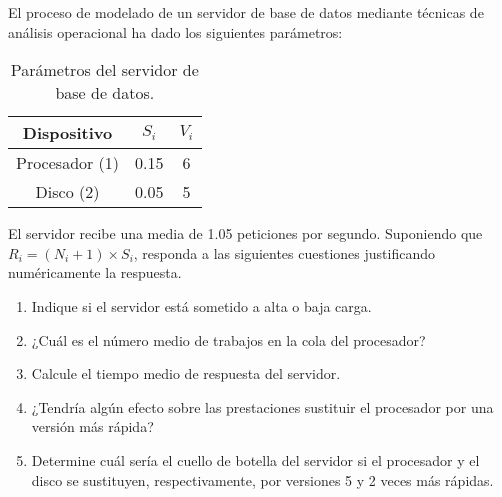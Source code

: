 \begin{ejercicio}\label{ej:5.24}
    El proceso de modelado de un servidor de base de datos mediante técnicas de análisis operacional ha dado los siguientes parámetros:
    \begin{table}[h]
        \centering
        \begin{tabular}{|c|c|c|}
            \hline
            Dispositivo & $S_i$ & $V_i$ \\
            \hline
            Procesador (1) & 0.15 & 6 \\
            Disco (2) & 0.05 & 5 \\
            \hline
        \end{tabular}
        \caption{Parámetros del servidor de base de datos.}
        \label{tab:5.24}
    \end{table}
    El servidor recibe una media de 1.05 peticiones por segundo. Suponiendo que $R_i = (N_i + 1) \times S_i$, responda a las siguientes cuestiones justificando numéricamente la respuesta.
    \begin{enumerate}
        \item Indique si el servidor está sometido a alta o baja carga.
        \item ¿Cuál es el número medio de trabajos en la cola del procesador?
        \item Calcule el tiempo medio de respuesta del servidor.
        \item ¿Tendría algún efecto sobre las prestaciones sustituir el procesador por una versión más rápida?
        \item Determine cuál sería el cuello de botella del servidor si el procesador y el disco se sustituyen, respectivamente, por versiones 5 y 2 veces más rápidas.
    \end{enumerate}
\end{ejercicio}
\begin{comment}
\solucion
    \begin{enumerate}
        \item La carga es alta porque la tasa de llegadas está cerca de su valor máximo de 1.11 peticiones por segundo.
        \item En la cola del procesador hay una media de 16.24 trabajos.
        \item El tiempo medio de respuesta es de 16.7 segundos.
        \item Sí porque el procesador es el cuello de botella del servidor.
        \item En este caso el cuello de botella seguirá siendo el procesador.
    \end{enumerate}
\end{comment}

